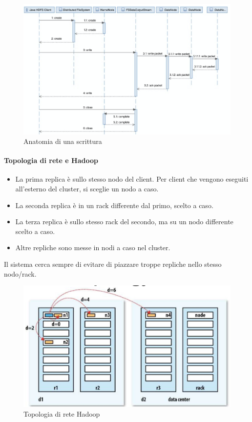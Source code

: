 \documentclass{article}
\begin{document}
\begin{appendices}
\begin{figure}[H]
    \centering
    \includegraphics[scale=0.3]{img/scrittura.png}
    \caption{Anatomia di una scrittura}
\end{figure}\noindent

\paragraph{Topologia di rete e Hadoop}
\begin{itemize}
    \item La prima replica è sullo stesso nodo del client. Per client che vengono eseguiti all'esterno del cluster, si sceglie un nodo a caso.
    \item La seconda replica è in un rack differente dal primo, scelto a caso.
    \item La terza replica è sullo stesso rack del secondo, ma su un nodo differente scelto a caso.
    \item Altre repliche sono messe in nodi a caso nel cluster.
\end{itemize}
Il sistema cerca sempre di evitare di piazzare troppe repliche nello stesso nodo/rack.
\begin{figure}[H]
    \centering
    \includegraphics[scale=0.3]{img/Topologia di rete hadoop.png}
    \caption{Topologia di rete Hadoop}
\end{figure}\noindent


\end{appendices}
\end{document}
